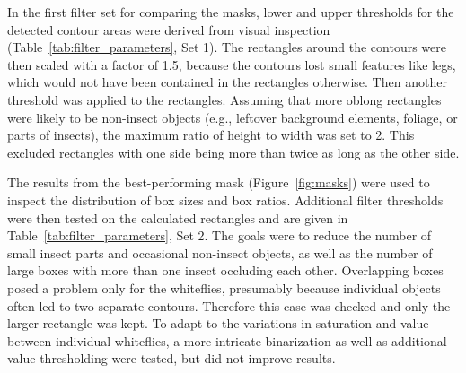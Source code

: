 \documentclass[12pt, a4paper]{article}
\begin{document}
In the first filter set for comparing the masks, lower and upper thresholds for the detected contour areas were derived from visual inspection (Table~\ref{tab:filter_parameters}, Set 1). The rectangles around the contours were then scaled with a factor of 1.5, because the contours lost small features like legs, which would not have been contained in the rectangles otherwise. Then another threshold was applied to the rectangles. Assuming that more oblong rectangles were likely to be non-insect objects (e.g., leftover background elements, foliage, or parts of insects), the maximum ratio of height to width was set to 2. This excluded rectangles with one side being more than twice as long as the other side.

The results from the best-performing mask (Figure~\ref{fig:masks}) were used to inspect the distribution of box sizes and box ratios. Additional filter thresholds were then tested on the calculated rectangles and are given in Table~\ref{tab:filter_parameters}, Set 2. The goals were to reduce the number of small insect parts and occasional non-insect objects, as well as the number of large boxes with more than one insect occluding each other. Overlapping boxes posed a problem only for the whiteflies, presumably because individual objects often led to two separate contours. Therefore this case was checked and only the larger rectangle was kept. To adapt to the variations in saturation and value between individual whiteflies, a more intricate binarization as well as additional value thresholding were tested, but did not improve results.
\end{document}
